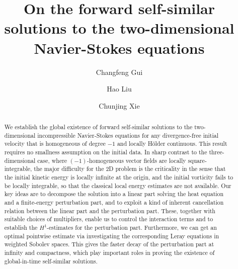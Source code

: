 \documentclass[12pt]{amsart}
\numberwithin{equation}{section}              %
\theoremstyle{remark}
\begin{document}
	\date{}                                     %
	
	
	
	
\author{Changfeng Gui}
\address{
Department of Mathematics, University of Macau, Taipa, Macau and
Zhuhai UM Science and Technology Research Institute, Hengqin, Guangdong, 519031, China}

	\author{Hao Liu}
	\address{Department of Mathematics, Faculty of Science and Technology, University of Macau, Taipa, Macao}
	\author{Chunjing Xie}
	\address{School of Mathematical Sciences, Institute of Natural Sciences,
		Ministry of Education Key Laboratory of Scientific and Engineering Computing,
		and CMA-Shanghai, Shanghai Jiao Tong University, 800 Dongchuan Road, Shanghai, China}
	
	\title[Forward self-similar solutions to 2D Navier-Stokes equations]{On  the forward self-similar solutions to the two-dimensional Navier-Stokes equations}
	
	
	
	
	\begin{abstract}
		
		
		We establish the global existence of forward self-similar solutions to the two-dimensional incompressible Navier-Stokes equations for any divergence-free initial velocity that is homogeneous of degree $-1$ and locally H\"older continuous. This result requires no smallness assumption on the initial data.
		In sharp contrast to the three-dimensional case, where $(-1)$-homogeneous vector fields are locally square-integrable, the major difficulty for the 2D problem is the criticality in the sense that the initial kinetic energy is locally infinite at the origin, and the initial vorticity fails to be locally integrable, so that the classical local energy estimates are not available.
		Our key ideas are to  decompose the solution into a linear part solving the heat equation and a finite-energy perturbation part, and to exploit  a kind of inherent cancellation relation between the linear part and the perturbation part. These, together with suitable choices of multipliers, enable us to control  the interaction terms and to establish the $H^1$-estimates for the perturbation part. 
		Furthermore,  we can get an optimal pointwise estimate via investigating the corresponding Leray equations in  weighted Sobolev spaces.
		This gives the faster decay of the perturbation part at infinity and compactness, which play important roles in proving
		 the existence of global-in-time self-similar solutions.
	\end{abstract}
    
\end{document}
